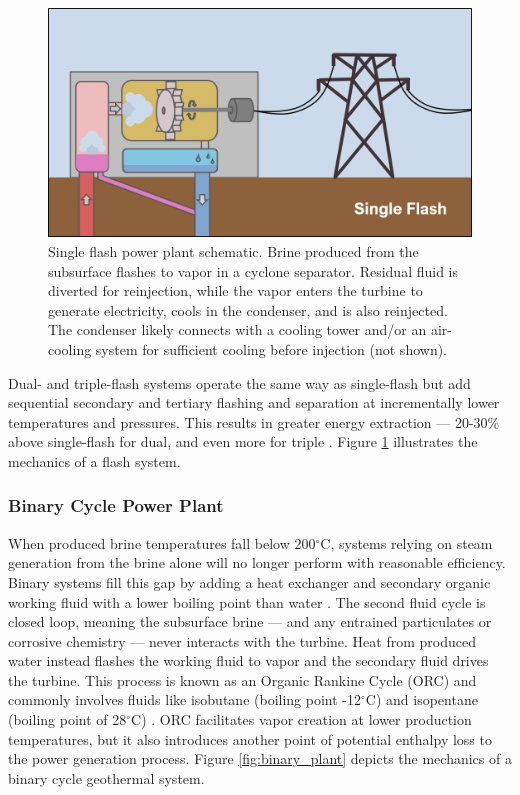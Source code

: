 \begin{figure}[H] %
\centering
\includegraphics[width=.9\textwidth]{templates/images/Figure-FlashPlant_Schematic.png}
\caption[Flash geothermal power plant schematic]{Single flash power plant schematic. Brine produced from the subsurface flashes to vapor in a cyclone separator. Residual fluid is diverted for reinjection, while the vapor enters the turbine to generate electricity, cools in the condenser, and is also reinjected. The condenser likely connects with a cooling tower and/or an air-cooling system for sufficient cooling before injection (not shown).}
\label{fig:flash_plant}
\end{figure}

Dual- and triple-flash systems operate the same way as single-flash but add sequential secondary and tertiary flashing and separation at incrementally lower temperatures and pressures. This results in greater energy extraction --- 20-30\% above single-flash for dual, and even more for triple \citep[p.\ 216]{glassley_geothermal_2015}. Figure \ref{fig:flash_plant} illustrates the mechanics of a flash system.

\subsubsection{Binary Cycle Power Plant}\label{ch2:binary_plant}
When produced brine temperatures fall below 200$^\circ$C, systems relying on steam generation from the brine alone will no longer perform with reasonable efficiency. Binary systems fill this gap by adding a heat exchanger and secondary organic working fluid with a lower boiling point than water \citep{moore_more_2013}. The second fluid cycle is closed loop, meaning the subsurface brine --- and any entrained particulates or corrosive chemistry --- never interacts with the turbine. Heat from produced water instead flashes the working fluid to vapor and the secondary fluid drives the turbine. This process is known as an Organic Rankine Cycle (ORC) and commonly involves fluids like isobutane (boiling point -12$^\circ$C) and isopentane (boiling point of 28$^\circ$C) \citep[p.\ 219]{glassley_geothermal_2015}. ORC facilitates vapor creation at lower production temperatures, but it also introduces another point of potential enthalpy loss to the power generation process. Figure \ref{fig:binary_plant} depicts the mechanics of a binary cycle geothermal system.

